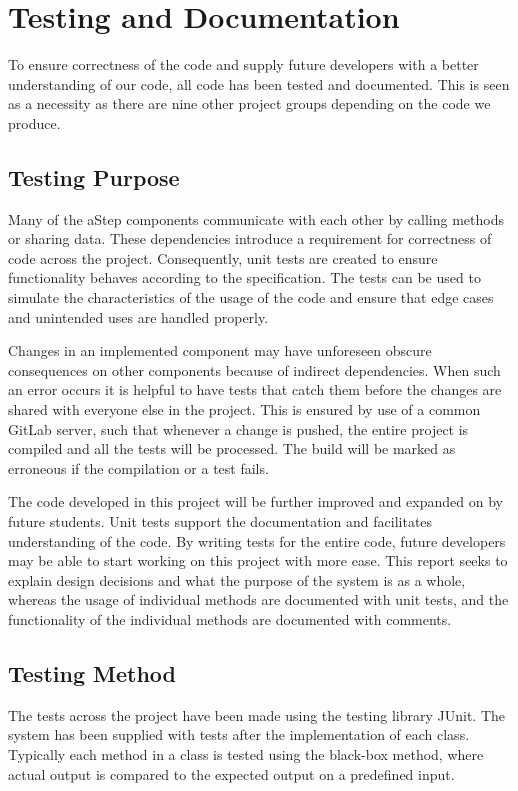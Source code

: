 \section{Testing and Documentation}\label{sec:unit_test}
To ensure correctness of the code and supply future developers with a better understanding of our code, all code has been tested and documented. This is seen as a necessity as there are nine other project groups depending on the code we produce.

\subsection{Testing Purpose}
Many of the aStep components communicate with each other by calling methods or sharing data. These dependencies introduce a requirement for correctness of code across the project. Consequently, unit tests are created to ensure functionality behaves according to the specification. The tests can be used to simulate the characteristics of the usage of the code and ensure that edge cases and unintended uses are handled properly. 

Changes in an implemented component may have unforeseen obscure consequences on other components because of indirect dependencies. When such an error occurs it is helpful to have tests that catch them before the changes are shared with everyone else in the project. This is ensured by use of a common GitLab server, such that whenever a change is pushed, the entire project is compiled and all the tests will be processed. The build will be marked as erroneous if the compilation or a test fails.

The code developed in this project will be further improved and expanded on by future students. Unit tests support the documentation and facilitates understanding of the code.
By writing tests for the entire code, future developers may be able to start working on this project with more ease. 
This report seeks to explain design decisions and what the purpose of the system is as a whole, whereas the usage of individual methods are documented with unit tests, and the functionality of the individual methods are documented with comments.

\subsection{Testing Method}
The tests across the project have been made using the testing library JUnit\cite{junit4}. The system has been supplied with tests after the implementation of each class. Typically each method in a class is tested using the black-box method, where actual output is compared to the expected output on a predefined input.

